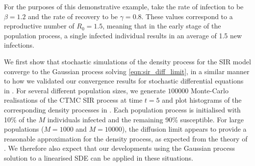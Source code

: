 For the purposes of this demonstrative example, take the rate of infection to be \(\beta = 1.2\) and the rate of recovery to be \(\gamma = 0.8\).
These values correspond to a reproductive number of \(R_0 = 1.5\), meaning that in the early stage of the population process, a single infected individual results in an average of 1.5 new infections.

We first show that stochastic simulations of the density process for the SIR model converge to the Gaussian process solving \cref{eqn:sir_diff_limit}, in a similar manner to how we validated our convergence results for stochastic differential equations in .
For several different population sizes, we generate \(100000\) Monte-Carlo realisations of the CTMC SIR process at time \(t = 5\) and plot histograms of the corresponding density processes in .
Each population process is initialised with 10\% of the \(M\) individuals infected and the remaining 90\% susceptible.
For large populations (\(M = 1000\) and \(M = 10000\)), the diffusion limit appears to provide a reasonable approximation for the density process, as expected from the theory of \citet{Kurtz_1970_SolutionsOrdinaryDifferential,Kurtz_1971_LimitTheoremsSequences}.
We therefore also expect that our developments using the Gaussian process solution to a linearised SDE can be applied in these situations.

